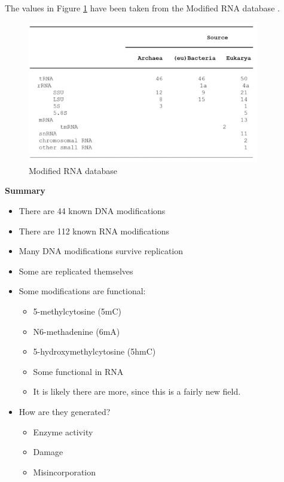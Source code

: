 \documentclass[]{article}
\begin{document}
The values in Figure \ref{fig:ModifiedRNAdatabase} have been taken from the Modified RNA database \cite{agriss2019RNA}.

\begin{figure}[H]
	\caption{Modified RNA database} \label{fig:ModifiedRNAdatabase} 
	\includegraphics[width=0.9\textwidth]{ModifiedRNAdatabase}
\end{figure}

\textbf{Summary}

\begin{itemize}
	\item There are 44 known DNA modifications
	\item There are 112 known RNA modifications
	\item Many DNA modifications survive replication
	\item Some are replicated themselves
	\item Some modifications are functional:\begin{itemize}
		\item 5-methylcytosine (5mC)
		\item N6-methadenine (6mA)
		\item 5-hydroxymethylcytosine (5hmC)
		\item Some functional in RNA
		\item It is likely there are more, since this is a fairly new field.
	\end{itemize}
	\item How are they generated?
	\begin{itemize}
		\item Enzyme activity
		\item Damage
		\item Misincorporation
	\end{itemize}
\end{itemize}
\end{document}
